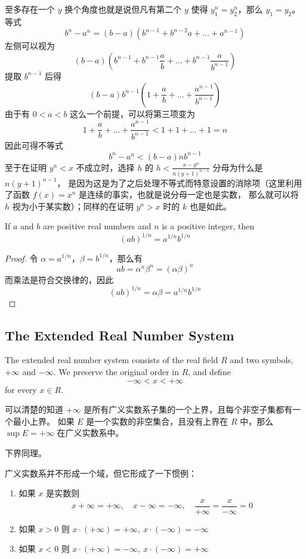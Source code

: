 \documentclass[../poma-notes.tex]{subfiles}
\begin{document}
\begin{anote}
	至多存在一个 $y$ 换个角度也就是说但凡有第二个 $y$ 使得 $y^n_1 = y^n_2$，那么 $y_1 = y_2$。\\
	等式
	\[b^n - a^n = (b-a)(b^{n-1} + b^{n-2}a + \dots + a^{n-1})\]
	左侧可以视为
	\[(b-a)(b^{n-1} + b^{n-1}\frac{a}{b} + \dots + b^{n-1}\frac{a}{b^{n-1}})\]
	提取 $b^{n-1}$ 后得
	\[(b-a)b^{n-1}(1 + \frac{a}{b} + \dots + \frac{a^{n-1}}{b^{n-1}})\]
	由于有 $0<a<b$ 这么一个前提，可以将第三项变为
	\[1 + \frac{a}{b} + \dots + \frac{a^{n-1}}{b^{n-1}} < 1 + 1 + \dots + 1 = n\]
	因此可得不等式
	\[b^n - a^n < (b-a)nb^{n-1}\]
	至于在证明 $y^n < x$ 不成立时，选择 $h$ 的 $h<\frac{x-y^n}{n(y+1)^{n-1}}$ 分母为什么是 $n(y+1)^{n-1}$，
	是因为这是为了之后处理不等式而特意设置的消除项（这里利用了函数 $f(x)=x^n$ 是连续的事实，也就是说分母一定也是实数，
	那么就可以将 $h$ 视为小于某实数）；同样的在证明 $y^n > x$ 时的 $k$ 也是如此。
\end{anote}

\begin{corollary}
	If $a$ and $b$ are positive real numbers and $n$ is a positive integer, then
	\[(ab)^{1/n} = a^{1/n}b^{1/n}\]
\end{corollary}

\begin{proof}
	令 $\alpha = a^{1/n}$，$\beta = b^{1/n}$，那么有
	\[ab = \alpha^n \beta^n = (\alpha\beta)^n\]
	而乘法是符合交换律的，因此
	\[(ab)^{1/n} = \alpha\beta = a^{1/n}b^{1/n}\]
\end{proof}

\subsection*{The Extended Real Number System}

\setcounter{poma}{22}
\begin{definition}
	The extended real number system consists of the real field $R$ and two symbols, $+\infty$ and $-\infty$.
	We preserve the original order in $R$, and define
	\[-\infty < x < +\infty\]
	for every $x \in R$.
\end{definition}

可以清楚的知道 $+\infty$ 是所有广义实数系子集的一个上界，且每个非空子集都有一个最小上界。
如果 $E$ 是一个实数的非空集合，且没有上界在 $R$ 中，那么 $\sup E = + \infty$ 在广义实数系中。

下界同理。

广义实数系并不形成一个域，但它形成了一下惯例：

\begin{enumerate}[label=(\alph*)]
	\item 如果 $x$ 是实数则
	      \[x+\infty=+\infty,\quad x-\infty=-\infty,\quad \frac{x}{+\infty}=\frac{x}{-\infty}=0\]
	\item 如果 $x>0$ 则 $x \cdot (+\infty) = +\infty,\ x \cdot (-\infty) = -\infty$
	\item 如果 $x<0$ 则 $x \cdot (+\infty) = -\infty,\ x \cdot (-\infty) = +\infty$
\end{enumerate}
\end{document}
